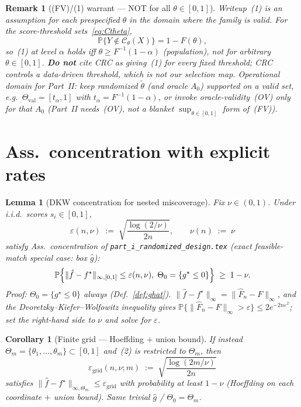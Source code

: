 \documentclass[11pt]{article}
\newtheorem{lemma}{Lemma}
\newtheorem{corollary}{Corollary}
\newtheorem{remark}{Remark}
\begin{document}
\begin{remark}[{(FV)/(1) warrant --- NOT for all $\theta\in[0,1]$}]
\label{rem:FV}
Writeup~(1) is an assumption for each \emph{prespecified} $\theta$ in the domain where the
family is valid. For the score-threshold sets~\eqref{eq:Ctheta},
\[
\mathbb{P}\{Y\notin\mathcal{C}_\theta(X)\}=1-F(\theta),
\]
so~(1) at level $\alpha$ holds iff $\theta\ge F^{-1}(1-\alpha)$ (population),
not for arbitrary $\theta\in[0,1]$.
\textbf{Do not} cite CRC as giving~(1) for every fixed threshold; CRC controls a
data-driven threshold, which is not our selection map.
Operational domain for Part~II: keep randomized $\tilde\theta$ (and oracle $A_0$)
supported on a valid set, e.g.\ $\Theta_{\mathrm{val}}=[t_\alpha,1]$ with
$t_\alpha=F^{-1}(1-\alpha)$, or invoke oracle-validity~(OV) only for that $A_0$
(Part~II needs~(OV), not a blanket $\sup_{\theta\in[0,1]}$ form of~(FV)).
\end{remark}

\section{Ass.\ concentration with explicit rates}

\begin{lemma}[DKW concentration for nested miscoverage]
\label{lem:dkw-conc}
Fix $\nu\in(0,1)$. Under i.i.d.\ scores $s_i\in[0,1]$,
\begin{equation}
\label{eq:eps-nu}
\varepsilon(n,\nu)
\;:=\;
\sqrt{\frac{\log(2/\nu)}{2n}},
\qquad
\nu(n)\;:=\;\nu
\end{equation}
satisfy Ass.\ concentration of \texttt{part\_i\_randomized\_design.tex}
(exact feasible-match special case: box $\hat g$):
\[
\mathbb{P}\Bigl\{\|\hat f-f^\star\|_{\infty,[0,1]}\le\varepsilon(n,\nu),\;
\Theta_0=\{g^\star\le 0\}\Bigr\}
\;\ge\; 1-\nu.
\]
\textit{Proof:} $\Theta_0=\{g^\star\le 0\}$ always (Def.~\ref{def:ghat}).
$\|\hat f-f^\star\|_\infty=\|\widehat F_n-F\|_\infty$, and the Dvoretzky--Kiefer--Wolfowitz
inequality gives $\mathbb{P}\{\|\widehat F_n-F\|_\infty>\varepsilon\}\le 2e^{-2n\varepsilon^2}$;
set the right-hand side to $\nu$ and solve for $\varepsilon$.
\end{lemma}

\begin{corollary}[Finite grid --- Hoeffding $+$ union bound]
\label{cor:grid}
If instead $\Theta_m=\{\theta_1,\ldots,\theta_m\}\subset[0,1]$ and~(2) is restricted to $\Theta_m$, then
\begin{equation}
\label{eq:eps-grid}
\varepsilon_{\mathrm{grid}}(n,\nu;m)
\;:=\;
\sqrt{\frac{\log(2m/\nu)}{2n}}
\end{equation}
satisfies $\|\hat f-f^\star\|_{\infty,\Theta_m}\le\varepsilon_{\mathrm{grid}}$ with probability at least $1-\nu$
(Hoeffding on each coordinate $+$ union bound). Same trivial $\hat g$ / $\Theta_0=\Theta_m$.
\end{corollary}
\end{document}
